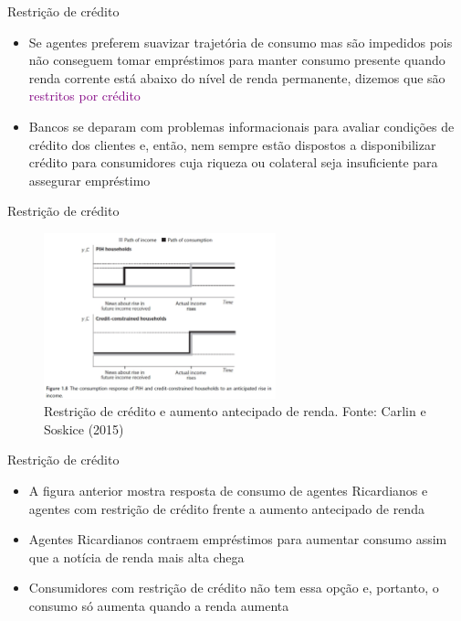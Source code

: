 \documentclass[10pt]{beamer}
\begin{document}
\begin{frame}
    {Restrição de crédito}
    \begin{itemize}
        \item Se agentes preferem suavizar trajetória de consumo mas são impedidos pois não conseguem tomar empréstimos para manter consumo presente quando renda corrente está abaixo do nível de renda permanente, dizemos que são \textcolor{purple}{restritos por crédito}\bigskip
        \item Bancos se deparam com problemas informacionais para avaliar condições de crédito dos clientes e, então, nem sempre estão dispostos a disponibilizar crédito para consumidores cuja riqueza ou colateral seja insuficiente para assegurar empréstimo\bigskip        
    \end{itemize}
\end{frame}

\begin{frame}
    {Restrição de crédito}
    \begin{figure}
        \centering
        \includegraphics[width=0.6\textwidth]{./figures/aula7_fig14.PNG}
        \caption{Restrição de crédito e aumento antecipado de renda. Fonte: Carlin e Soskice (2015)}
    \end{figure}
\end{frame}

\begin{frame}
    {Restrição de crédito}
    \begin{itemize}
        \item A figura anterior mostra resposta de consumo de agentes Ricardianos e agentes com restrição de crédito frente a aumento antecipado de renda\bigskip
        \item Agentes Ricardianos contraem empréstimos para aumentar consumo assim que a notícia de renda mais alta chega\bigskip
        \item Consumidores com restrição de crédito não tem essa opção e, portanto, o consumo só aumenta quando a renda aumenta
    \end{itemize}
\end{frame}
\end{document}
